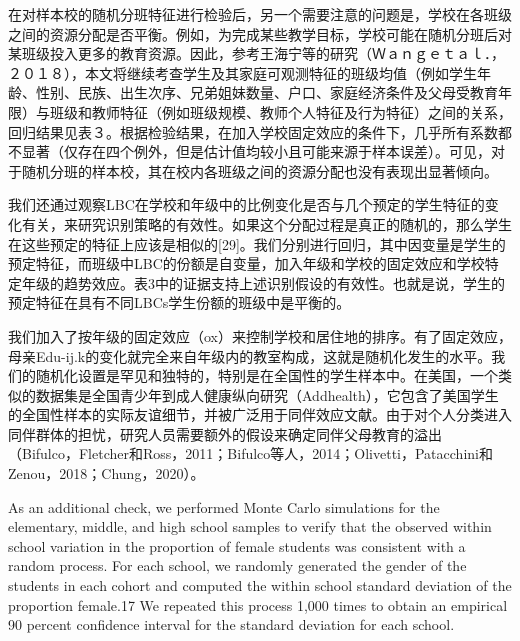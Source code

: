 在对样本校的随机分班特征进行检验后，另一个需要注意的问题是，学校在各班级之间的资源分配是否平衡。例如，为完成某些教学目标，学校可能在随机分班后对某班级投入更多的教育资源。因此，参考王海宁等的研究（Ｗａｎｇｅｔａｌ．，２０１８），本文将继续考查学生及其家庭可观测特征的班级均值（例如学生年龄、性别、民族、出生次序、兄弟姐妹数量、户口、家庭经济条件及父母受教育年限）与班级和教师特征（例如班级规模、教师个人特征及行为特征）之间的关系，回归结果见表３。根据检验结果，在加入学校固定效应的条件下，几乎所有系数都不显著（仅存在四个例外，但是估计值均较小且可能来源于样本误差）。可见，对于随机分班的样本校，其在校内各班级之间的资源分配也没有表现出显著倾向。

我们还通过观察LBC在学校和年级中的比例变化是否与几个预定的学生特征的变化有关，来研究识别策略的有效性。如果这个分配过程是真正的随机的，那么学生在这些预定的特征上应该是相似的[29]。我们分别进行回归，其中因变量是学生的预定特征，而班级中LBC的份额是自变量，加入年级和学校的固定效应和学校特定年级的趋势效应。表3中的证据支持上述识别假设的有效性。也就是说，学生的预定特征在具有不同LBCs学生份额的班级中是平衡的。

我们加入了按年级的固定效应（ox）来控制学校和居住地的排序。有了固定效应，母亲Edu-ij.k的变化就完全来自年级内的教室构成，这就是随机化发生的水平。我们的随机化设置是罕见和独特的，特别是在全国性的学生样本中。在美国，一个类似的数据集是全国青少年到成人健康纵向研究（Addhealth），它包含了美国学生的全国性样本的实际友谊细节，并被广泛用于同伴效应文献。由于对个人分类进入同伴群体的担忧，研究人员需要额外的假设来确定同伴父母教育的溢出（Bifulco，Fletcher和Ross，2011；Bifulco等人，2014；Olivetti，Patacchini和Zenou，2018；Chung，2020）。

As an additional check, we performed Monte Carlo simulations for the elementary, middle, and high school samples to verify that the observed within school variation in the proportion of female students was consistent with a random process. For each school, we randomly generated the gender of the students in each cohort and computed the within school standard deviation of the proportion female.17 We repeated this process 1,000 times to obtain an empirical 90 percent confidence interval for the standard deviation for each school.


